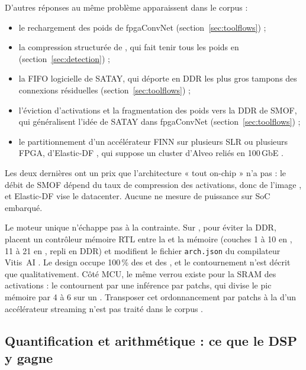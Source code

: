 D'autres réponses au même problème apparaissent dans le corpus :
\begin{itemize}
  \item le rechargement des poids de fpgaConvNet (section~\ref{sec:toolflows}) ;
  \item la compression structurée de , qui fait tenir tous les poids en 
    (section~\ref{sec:detection}) ;
  \item la FIFO logicielle de SATAY, qui déporte en DDR les plus gros tampons des
    connexions résiduelles (section~\ref{sec:toolflows}) ;
  \item l'éviction d'activations et la fragmentation des poids vers la DDR de SMOF, qui
    généralisent l'idée de SATAY dans fpgaConvNet
    \citep{arxiv-2403.18921-smof-streaming-modern-cnns-fpgas}\pp{}
    (section~\ref{sec:toolflows}) ;
  \item le partitionnement d'un accélérateur FINN sur plusieurs SLR ou plusieurs FPGA,
    d'Elastic-DF \citep{2021-alonso-elastic-df-scaling-performance-dnn}, qui suppose un
    cluster d'Alveo reliés en 100\,GbE .
\end{itemize}
Les deux dernières ont un prix que l'architecture « tout on-chip » n'a pas : le débit de
SMOF dépend du taux de compression des activations, donc de l'image
\citep[Fig.~8]{arxiv-2403.18921-smof-streaming-modern-cnns-fpgas}, et Elastic-DF vise le
datacenter. Aucune ne mesure de puissance sur SoC embarqué.

Le moteur unique n'échappe pas à la contrainte. Sur , pour éviter la DDR,
\citet{2026-fata-low-cost-fpga-enhanced-cnn} placent un contrôleur mémoire RTL entre la 
et la mémoire (couches 1 à 10 en , 11 à 21 en , repli en DDR) et modifient le
fichier \texttt{arch.json} du compilateur Vitis~AI . Le design occupe 100\,\%
des  et des  , et le contournement n'est décrit que qualitativement.
Côté MCU, le même verrou existe pour la SRAM des activations :
\citet{arxiv-2110.15352-mcunetv2-memory-efficient-patch-inference} le contournent par une
inférence par patchs, qui divise le pic mémoire par 4 à 6 sur un  .
Transposer cet ordonnancement par patchs à la  d'un accélérateur streaming n'est pas
traité dans le corpus \deduit.

\subsection{Quantification et arithmétique : ce que le DSP y gagne}

